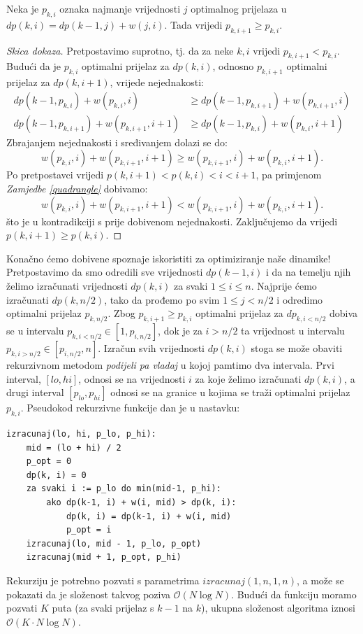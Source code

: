 \begin{zamjedba}
  Neka je $p_{k,i}$ oznaka najmanje vrijednosti $j$ optimalnog prijelaza u
  $dp(k,i) = dp(k-1,j) + w(j, i)$. Tada vrijedi $p_{k,i+1} \ge p_{k,i}$.
\end{zamjedba}

\begin{proof}[Skica dokaza]
  Pretpostavimo suprotno, tj. da za neke $k, i$
  vrijedi $p_{k,i+1} < p_{k,i}$. Budući da je $p_{k,i}$ optimalni prijelaz
  za $dp(k,i)$, odnosno $p_{k,i+1}$ optimalni prijelaz za $dp(k,i+1)$,
  vrijede nejednakosti:
  \begin{equation*}
    \begin{aligned}
      dp(k-1,p_{k,i}) + w(p_{k,i}, i) &\geq dp(k-1,p_{k,i+1}) + w(p_{k,i+1},i) \\
      dp(k-1,p_{k,i+1}) + w(p_{k,i+1},i+1) &\geq dp(k-1,p_{k,i}) + w(p_{k,i},i+1)
    \end{aligned}
  \end{equation*}
  Zbrajanjem nejednakosti i sređivanjem dolazi se do:
  \begin{equation*}
    w(p_{k,i},i) + w(p_{k,i+1},i+1) \geq w(p_{k,i+1},i) + w(p_{k,i},i+1).
  \end{equation*}
  Po pretpostavci vrijedi $p(k,i+1) < p(k,i) < i < i+1$, pa primjenom
  \textit{Zamjedbe \ref{quadrangle}} dobivamo:
  \begin{equation*}
    w(p_{k,i},i) + w(p_{k,i+1},i+1) < w(p_{k,i+1},i) + w(p_{k,i},i+1).
  \end{equation*}
  što je u kontradikciji s prije dobivenom nejednakosti. Zaključujemo
  da vrijedi $p(k,i+1) \geq p(k,i)$.
\end{proof}
 
Konačno ćemo dobivene spoznaje iskoristiti za optimiziranje naše dinamike!
Pretpostavimo da smo odredili sve vrijednosti $dp(k-1,i)$ i da na temelju
njih želimo izračunati vrijednosti $dp(k,i)$ za svaki $1 \le i \le n$.
Najprije ćemo izračunati $dp(k,n/2)$, tako da prođemo po svim $1 \le j < n/2$
i odredimo optimalni prijelaz $p_{k,n/2}$. Zbog $p_{k,i+1} \ge p_{k,i}$ optimalni prijelaz
za $dp_{k,i<n/2}$ dobiva se u intervalu $p_{k,i<n/2} \in [1, p_{i,n/2}]$,
dok je za $i>n/2$ ta vrijednost u intervalu $p_{k,i>n/2} \in [p_{i,n/2},n]$.
Izračun svih vrijednosti $dp(k,i)$ stoga se može obaviti rekurzivnom metodom
\textit{podijeli pa vladaj} u kojoj pamtimo dva intervala. Prvi interval,
$[lo, hi]$, odnosi se na vrijednosti $i$ za koje želimo izračunati $dp(k, i)$,
a drugi interval $[p_{lo}, p_{hi}]$ odnosi se na granice u kojima se traži
optimalni prijelaz $p_{k,i}$. Pseudokod rekurzivne funkcije dan je u nastavku:
\begin{verbatim}
izracunaj(lo, hi, p_lo, p_hi):
    mid = (lo + hi) / 2
    p_opt = 0
    dp(k, i) = 0
    za svaki i := p_lo do min(mid-1, p_hi):
        ako dp(k-1, i) + w(i, mid) > dp(k, i):
            dp(k, i) = dp(k-1, i) + w(i, mid)
            p_opt = i
    izracunaj(lo, mid - 1, p_lo, p_opt)
    izracunaj(mid + 1, p_opt, p_hi)
\end{verbatim}

Rekurziju je potrebno pozvati s parametrima $izracunaj(1, n, 1, n)$, a može se
pokazati da je složenost takvog poziva $\mathcal{O}(N \log N)$. Budući da funkciju
moramo pozvati $K$ puta (za svaki prijelaz s $k-1$ na $k$), ukupna složenost
algoritma iznosi $\mathcal{O}(K \cdot N \log N)$.



